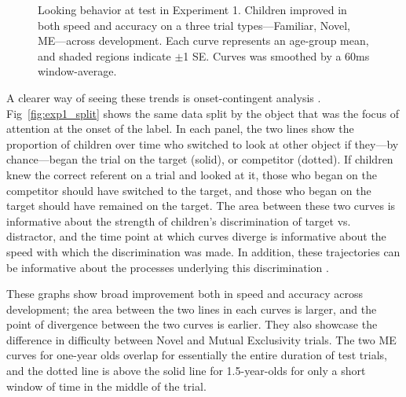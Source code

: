 \documentclass[man,floatsintext]{apa6}
\begin{document}
\begin{figure}[tb]
	\caption{\label{fig:exp1_test_spaghetti}Looking behavior at test in Experiment 1. Children improved in both speed and accuracy on a three trial types---Familiar, Novel, ME---across development. Each curve represents an age-group mean, and shaded regions indicate $\pm$1 SE. Curves was smoothed by a 60ms window-average.}
\end{figure}

A clearer way of seeing these trends is onset-contingent analysis \cite{fernald2008}. Fig~\ref{fig:exp1_split} shows the same data split by the object that was the focus of attention at the onset of the label. In each panel, the two lines show the proportion of children over time who switched to look at other object if they---by chance---began the trial on the target (solid), or competitor (dotted). If children knew the correct referent on a trial and looked at it, those who began on the competitor should have switched to the target, and those who began on the target should have remained on the target. The area between these two curves is informative about the strength of children's discrimination of target vs. distractor, and the time point at which curves diverge is informative about the speed with which the discrimination was made. In addition, these trajectories can be informative about the processes underlying this discrimination \cite{Halberda2006}. 

These graphs show broad improvement both in speed and accuracy across development; the area between the two lines in each curves is larger, and the point of divergence between the two curves is earlier. They also showcase the difference in difficulty between Novel and Mutual Exclusivity trials. The two ME curves for one-year olds overlap for essentially the entire duration of test trials, and the dotted line is above the solid line for 1.5-year-olds for only a short window of time in the middle of the trial. 
\end{document}
